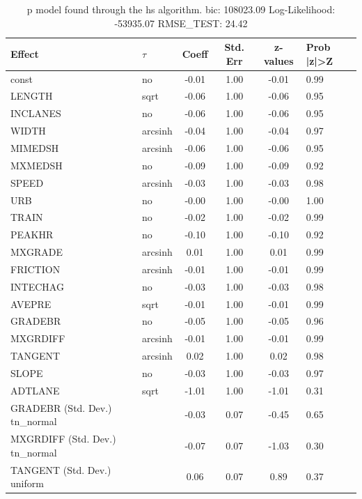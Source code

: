 \begin{table}
	\caption{p model found through the hs algorithm. bic: 108023.09 Log-Likelihood: -53935.07 RMSE_TEST: 24.42}
	\begin{center}
		\begin{tabular}{|l|l|c|c|c|l|}
			\hline
			Effect & $\tau$ & Coeff & Std. Err & z-values & Prob |z|>Z \\
			\hline
			const & no & -0.01 & 1.00 & -0.01 & 0.99 \\
			\hline
			LENGTH & sqrt & -0.06 & 1.00 & -0.06 & 0.95 \\
			\hline
			INCLANES & no & -0.06 & 1.00 & -0.06 & 0.95 \\
			\hline
			WIDTH & arcsinh & -0.04 & 1.00 & -0.04 & 0.97 \\
			\hline
			MIMEDSH & arcsinh & -0.06 & 1.00 & -0.06 & 0.95 \\
			\hline
			MXMEDSH & no & -0.09 & 1.00 & -0.09 & 0.92 \\
			\hline
			SPEED & arcsinh & -0.03 & 1.00 & -0.03 & 0.98 \\
			\hline
			URB & no & -0.00 & 1.00 & -0.00 & 1.00 \\
			\hline
			TRAIN & no & -0.02 & 1.00 & -0.02 & 0.99 \\
			\hline
			PEAKHR & no & -0.10 & 1.00 & -0.10 & 0.92 \\
			\hline
			MXGRADE & arcsinh & 0.01 & 1.00 & 0.01 & 0.99 \\
			\hline
			FRICTION & arcsinh & -0.01 & 1.00 & -0.01 & 0.99 \\
			\hline
			INTECHAG & no & -0.03 & 1.00 & -0.03 & 0.98 \\
			\hline
			AVEPRE & sqrt & -0.01 & 1.00 & -0.01 & 0.99 \\
			\hline
			GRADEBR & no & -0.05 & 1.00 & -0.05 & 0.96 \\
			\hline
			MXGRDIFF & arcsinh & -0.01 & 1.00 & -0.01 & 0.99 \\
			\hline
			TANGENT & arcsinh & 0.02 & 1.00 & 0.02 & 0.98 \\
			\hline
			SLOPE & no & -0.03 & 1.00 & -0.03 & 0.97 \\
			\hline
			ADTLANE & sqrt & -1.01 & 1.00 & -1.01 & 0.31 \\
			\hline
			GRADEBR (Std. Dev.) tn_normal &  & -0.03 & 0.07 & -0.45 & 0.65 \\
			\hline
			MXGRDIFF (Std. Dev.) tn_normal &  & -0.07 & 0.07 & -1.03 & 0.30 \\
			\hline
			TANGENT (Std. Dev.) uniform &  & 0.06 & 0.07 & 0.89 & 0.37 \\

\end{tabular}
\end{center}
\end{table}

